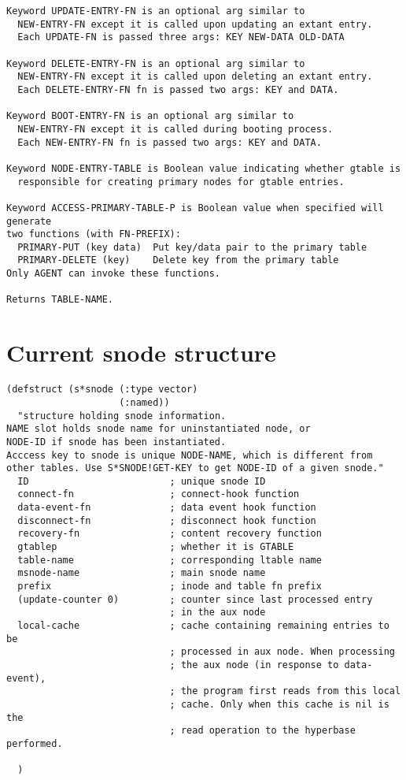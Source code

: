 \begin{verbatim}
Keyword UPDATE-ENTRY-FN is an optional arg similar to 
  NEW-ENTRY-FN except it is called upon updating an extant entry.
  Each UPDATE-FN is passed three args: KEY NEW-DATA OLD-DATA

Keyword DELETE-ENTRY-FN is an optional arg similar to 
  NEW-ENTRY-FN except it is called upon deleting an extant entry.
  Each DELETE-ENTRY-FN fn is passed two args: KEY and DATA.

Keyword BOOT-ENTRY-FN is an optional arg similar to
  NEW-ENTRY-FN except it is called during booting process.
  Each NEW-ENTRY-FN fn is passed two args: KEY and DATA.

Keyword NODE-ENTRY-TABLE is Boolean value indicating whether gtable is 
  responsible for creating primary nodes for gtable entries.

Keyword ACCESS-PRIMARY-TABLE-P is Boolean value when specified will generate
two functions (with FN-PREFIX):
  PRIMARY-PUT (key data)  Put key/data pair to the primary table
  PRIMARY-DELETE (key)    Delete key from the primary table
Only AGENT can invoke these functions.

Returns TABLE-NAME.
\end{verbatim}\normalsize



\newpage
\section{Current snode structure}
\label{app:snode}

\small\begin{verbatim}
(defstruct (s*snode (:type vector)
                    (:named))
  "structure holding snode information.
NAME slot holds snode name for uninstantiated node, or
NODE-ID if snode has been instantiated.
Acccess key to snode is unique NODE-NAME, which is different from
other tables. Use S*SNODE!GET-KEY to get NODE-ID of a given snode."
  ID                         ; unique snode ID
  connect-fn                 ; connect-hook function
  data-event-fn              ; data event hook function
  disconnect-fn              ; disconnect hook function
  recovery-fn                ; content recovery function
  gtablep                    ; whether it is GTABLE
  table-name                 ; corresponding ltable name
  msnode-name                ; main snode name
  prefix                     ; inode and table fn prefix
  (update-counter 0)         ; counter since last processed entry 
                             ; in the aux node
  local-cache                ; cache containing remaining entries to be 
                             ; processed in aux node. When processing 
                             ; the aux node (in response to data-event), 
                             ; the program first reads from this local
                             ; cache. Only when this cache is nil is the 
                             ; read operation to the hyperbase performed.

  )

\end{verbatim}\normalsize


